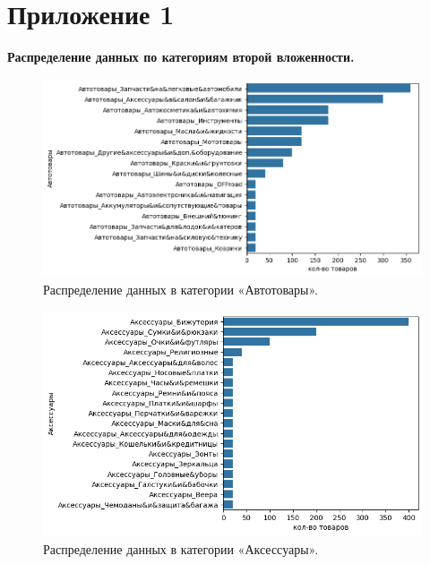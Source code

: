 \documentclass[a4paper,12pt]{extarticle}
\begin{document}
\newpage
\appendix

\section{Приложение 1}
\label{appendix:amount_of_categor2}
\textbf{\large{Распределение данных по категориям второй вложенности.}}

\begin{figure}[hbtp]
	\centering
	\includegraphics[scale=0.8]{приложения/amount_of_category_Автотовары.png}
	\caption{Распределение данных в категории «Автотовары».}
	\label{fig:amount_of_category_Автотовары}
\end{figure}

\begin{figure}[hbtp]
	\centering
	\includegraphics[scale=0.8]{приложения/amount_of_category_Аксессуары.png}
	\caption{Распределение данных в категории «Аксессуары».}
	\label{fig:amount_of_category_Аксессуары}
\end{figure}
\end{document}
